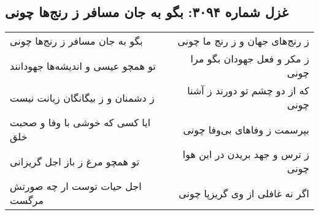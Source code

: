 \begin{center}
\section*{غزل شماره ۳۰۹۴: بگو به جان مسافر ز رنج‌ها چونی}
\label{sec:3094}
\begin{longtable}{l p{0.5cm} r}
بگو به جان مسافر ز رنج‌ها چونی
&&
ز رنج‌های جهان و ز رنج ما چونی
\\
تو همچو عیسی و اندیشه‌ها جهودانند
&&
ز مکر و فعل جهودان بگو مرا چونی
\\
ز دشمنان و ز بیگانگان زیانت نیست
&&
که از دو چشم تو دورند ز آشنا چونی
\\
ایا کسی که خوشی با وفا و صحبت خلق
&&
بپرسمت ز وفاهای بی‌وفا چونی
\\
تو همچو مرغ ز باز اجل گریزانی
&&
ز ترس و جهد بریدن در این هوا چونی
\\
اجل حیات توست ار چه صورتش مرگست
&&
اگر نه غافلی از وی گریزپا چونی
\\
\end{longtable}
\end{center}
